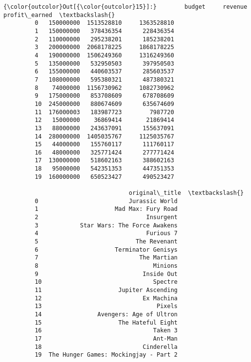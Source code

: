 \documentclass[11pt]{article}
\begin{document}
\begin{Verbatim}[commandchars=\\\{\}]
{\color{outcolor}Out[{\color{outcolor}15}]:}        budget     revenue  profit\_earned  \textbackslash{}
         0   150000000  1513528810     1363528810   
         1   150000000   378436354      228436354   
         2   110000000   295238201      185238201   
         3   200000000  2068178225     1868178225   
         4   190000000  1506249360     1316249360   
         5   135000000   532950503      397950503   
         6   155000000   440603537      285603537   
         7   108000000   595380321      487380321   
         8    74000000  1156730962     1082730962   
         9   175000000   853708609      678708609   
         10  245000000   880674609      635674609   
         11  176000003   183987723        7987720   
         12   15000000    36869414       21869414   
         13   88000000   243637091      155637091   
         14  280000000  1405035767     1125035767   
         15   44000000   155760117      111760117   
         16   48000000   325771424      277771424   
         17  130000000   518602163      388602163   
         18   95000000   542351353      447351353   
         19  160000000   650523427      490523427   
         
                                    original\_title  \textbackslash{}
         0                          Jurassic World   
         1                      Mad Max: Fury Road   
         2                               Insurgent   
         3            Star Wars: The Force Awakens   
         4                               Furious 7   
         5                            The Revenant   
         6                      Terminator Genisys   
         7                             The Martian   
         8                                 Minions   
         9                              Inside Out   
         10                                Spectre   
         11                      Jupiter Ascending   
         12                             Ex Machina   
         13                                 Pixels   
         14                Avengers: Age of Ultron   
         15                      The Hateful Eight   
         16                                Taken 3   
         17                                Ant-Man   
         18                             Cinderella   
         19  The Hunger Games: Mockingjay - Part 2   
         

\end{Verbatim}
\end{document}
